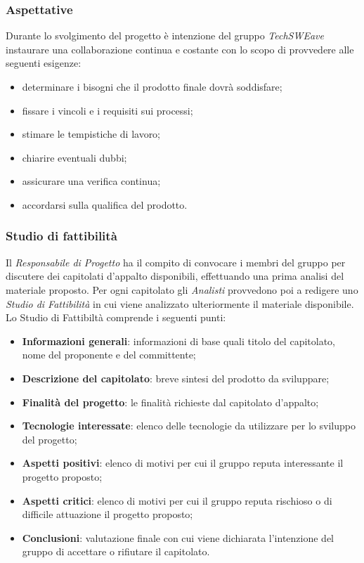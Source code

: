 \subsubsection{Aspettative}
Durante lo svolgimento del progetto è intenzione del gruppo \textit{TechSWEave} instaurare una collaborazione continua e costante con lo scopo di provvedere alle seguenti esigenze:
\begin{itemize}
    \item determinare i bisogni che il prodotto finale dovrà soddisfare;
    \item fissare i vincoli e i requisiti sui processi;
    \item stimare le tempistiche di lavoro;
    \item chiarire eventuali dubbi;
    \item assicurare una verifica continua;
    \item accordarsi sulla qualifica del prodotto.
\end{itemize}
\subsubsection{Studio di fattibilità}
Il \textit{Responsabile di Progetto} ha il compito di convocare i membri del gruppo per discutere dei capitolati d’appalto disponibili, effettuando una prima analisi del materiale proposto. Per ogni capitolato gli \textit{Analisti} provvedono poi a redigere uno \textit{Studio di Fattibilità} in cui viene analizzato ulteriormente il materiale disponibile.
\\Lo Studio di Fattibiltà comprende i seguenti punti:
\begin{itemize}
    \item \textbf{Informazioni generali}: informazioni di base quali titolo del capitolato, nome del proponente e del committente;
    \item \textbf{Descrizione del capitolato}: breve sintesi del prodotto da sviluppare;
    \item \textbf{Finalità del progetto}: le finalità richieste dal capitolato d’appalto;
    \item \textbf{Tecnologie interessate}: elenco delle tecnologie da utilizzare per lo sviluppo del progetto;
    \item \textbf{Aspetti positivi}: elenco di motivi per cui il gruppo reputa interessante il progetto proposto;
    \item \textbf{Aspetti critici}: elenco di motivi per cui il gruppo reputa rischioso o di difficile attuazione il progetto proposto;
    \item \textbf{Conclusioni}: valutazione finale con cui viene dichiarata l’intenzione del gruppo di accettare o rifiutare il capitolato.
\end{itemize}
